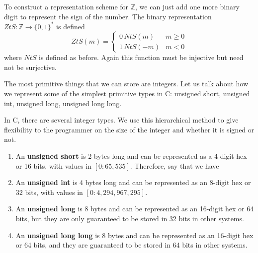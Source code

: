   \begin{definition}
    To construct a representation scheme for $\mathbb{Z}$, we can just add one more binary digit to represent the sign of the number. The binary representation $ZtS: \mathbb{Z} \longrightarrow \{0, 1\}^\ast$ is defined
    \[ZtS(m) = \begin{cases}
    0\, NtS(m) & m \geq 0 \\
    1 \, NtS(-m) & m < 0
    \end{cases}\]
    where $NtS$ is defined as before. Again this function must be injective but need not be surjective. 
  \end{definition}

  The most primitive things that we can store are integers. Let us talk about how we represent some of the simplest primitive types in C: unsigned short, unsigned int, unsigned long, unsigned long long.

  \begin{definition}
    In C, there are several integer types. We use this hierarchical method to give flexibility to the programmer on the size of the integer and whether it is signed or not. 
    \begin{enumerate} 
      \item An \textbf{unsigned short} is 2 bytes long and can be represented as a 4-digit hex or 16 bits, with values in $[0:65,535]$. Therefore, say that we have 
      \item An \textbf{unsigned int} is 4 bytes long and can be represented as an 8-digit hex or 32 bits, with values in $[0:4,294,967,295]$. 
      \item An \textbf{unsigned long} is 8 bytes and can be represented as an 16-digit hex or 64 bits, but they are only guaranteed to be stored in 32 bits in other systems. 
      \item An \textbf{unsigned long long} is 8 bytes and can be represented as an 16-digit hex or 64 bits, and they are guaranteed to be stored in 64 bits in other systems. 
    \end{enumerate} 
  \end{definition}

